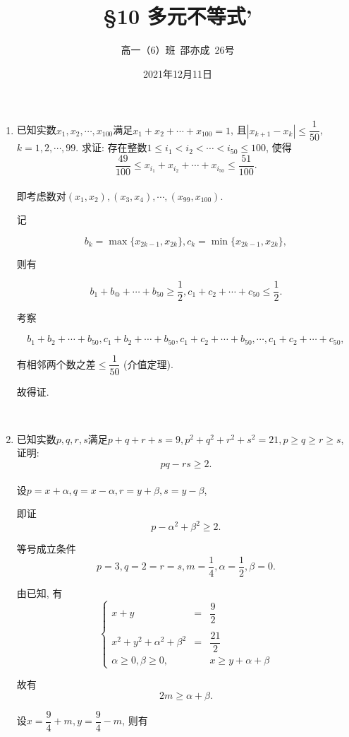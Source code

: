 \documentclass[8pt]{article}
\title{\S 10 多元不等式'}
\author{高一（6）班\ 邵亦成\ 26号}
\date{2021年12月11日}
\begin{document}
	\maketitle

	\begin{enumerate}
		\item 已知实数$x_1, x_2, \cdots, x_{100}$满足$x_1 + x_2 + \cdots + x_{100}=1$, 且$|x_{k+1}-x_k|\leq\dfrac{1}{50}$, $k=1, 2, \cdots, 99$. 求证: 存在整数$1\leq i_1 < i_2 < \cdots < i_{50} \leq 100$, 使得$$\frac{49}{100} \leq x_{i_1} + x_{i_2} + \cdots + x_{i_{50}} \leq \frac{51}{100}.$$
			~\\

			即考虑数对$(x_1, x_2), (x_3, x_4), \cdots, (x_{99}, x_{100}).$

			记

			$$b_k = \max\{x_{2k-1}, x_{2k}\}, c_k=\min\{x_{2k-1}, x_{2k}\},$$

			则有

			$$b_1 + b_@ + \cdots + b_{50} \geq \frac{1}{2}, c_1 + c_2 + \cdots + c_{50} \leq \frac{1}{2}.$$

			考察

			$$b_1+b_2+\cdots+b_{50}, c_1+b_2+\cdots+b_{50}, c_1+c_2+\cdots+b_{50}, \cdots, c_1+c_2+\cdots+c_{50},$$

			有相邻两个数之差$\leq\dfrac{1}{50}$ (介值定理).

			故得证.

		~\\

		\item 已知实数$p, q, r, s$满足$p+q+r+s=9, p^2+q^2+r^2+s^2=21, p\geq q\geq r\geq s$, 证明: $$pq-rs\geq 2.$$
			~\\

			设$p=x+\alpha, q=x-\alpha, r=y+\beta, s=y-\beta$,

			即证$$p - \alpha^2 + \beta^2 \geq 2.$$

			等号成立条件$$p=3, q=2=r=s, m=\frac{1}{4}, \alpha=\frac{1}{2}, \beta=0.$$

			由已知, 有$$\left\{\begin{array}{rcl}x+y&=&\dfrac{9}{2}\\\\x^2+y^2+\alpha^2+\beta^2&=&\dfrac{21}{2}\\\alpha \geq 0, \beta \geq 0, && x\geq y+\alpha+\beta\end{array}\right.$$

			故有$$2m\geq \alpha + \beta.$$

			设$x=\dfrac{9}{4}+m, y=\dfrac{9}{4}-m$, 则有


\end{enumerate}
\end{document}
